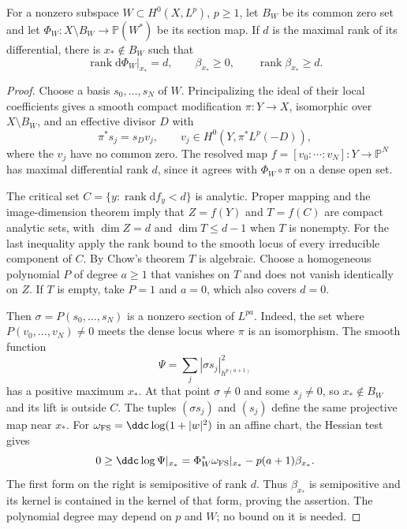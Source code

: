 \begin{proposition}\label{prop:section-map-curvature-rank}
For a nonzero subspace $W\subset H^0(X,L^p)$, $p\geq1$, let $B_W$ be its common zero set and let $\Phi_W:X\setminus B_W\to\mathbb P(W^*)$ be its section map. If $d$ is the maximal rank of its differential, there is $x_*\notin B_W$ such that
\[
 \operatorname{rank}\mathrm d\Phi_W|_{x_*}=d,
 \qquad \beta_{x_*}\geq0,
 \qquad \operatorname{rank}\beta_{x_*}\geq d.
\]
\end{proposition}
\begin{proof}
Choose a basis $s_0,\ldots,s_N$ of $W$. Principalizing the ideal of their local coefficients gives a smooth compact modification $\pi:Y\to X$, isomorphic over $X\setminus B_W$, and an effective divisor $D$ with
\[
 \pi^*s_j=s_Dv_j,\qquad
 v_j\in H^0(Y,\pi^*L^p(-D)),
\]
where the $v_j$ have no common zero. The resolved map $f=[v_0:\cdots:v_N]:Y\to\mathbb P^N$ has maximal differential rank $d$, since it agrees with $\Phi_W\circ\pi$ on a dense open set.

The critical set $C=\{y:\operatorname{rank}\mathrm df_y<d\}$ is analytic. Proper mapping and the image-dimension theorem imply that $Z=f(Y)$ and $T=f(C)$ are compact analytic sets, with $\dim Z=d$ and $\dim T\leq d-1$ when $T$ is nonempty. For the last inequality apply the rank bound to the smooth locus of every irreducible component of $C$. By Chow's theorem $T$ is algebraic. Choose a homogeneous polynomial $P$ of degree $a\geq1$ that vanishes on $T$ and does not vanish identically on $Z$. If $T$ is empty, take $P=1$ and $a=0$, which also covers $d=0$.

Then $\sigma=P(s_0,\ldots,s_N)$ is a nonzero section of $L^{pa}$. Indeed, the set where $P(v_0,\ldots,v_N)\ne0$ meets the dense locus where $\pi$ is an isomorphism. The smooth function
\[
 \Psi=\sum_j|\sigma s_j|_{h^{p(a+1)}}^2
\]
has a positive maximum $x_*$. At that point $\sigma\ne0$ and some $s_j\ne0$, so $x_*\notin B_W$ and its lift is outside $C$. The tuples $(\sigma s_j)$ and $(s_j)$ define the same projective map near $x_*$. For $\omega_{\mathrm{FS}}=\ddc\log(1+|w|^2)$ in an affine chart, the Hessian test gives
\[
 0\geq\ddc\log\Psi|_{x_*}
   =\Phi_W^*\omega_{\mathrm{FS}}|_{x_*}
                    -p(a+1)\beta_{x_*}.
\]
The first form on the right is semipositive of rank $d$. Thus $\beta_{x_*}$ is semipositive and its kernel is contained in the kernel of that form, proving the assertion. The polynomial degree may depend on $p$ and $W$; no bound on it is needed.
\end{proof}

